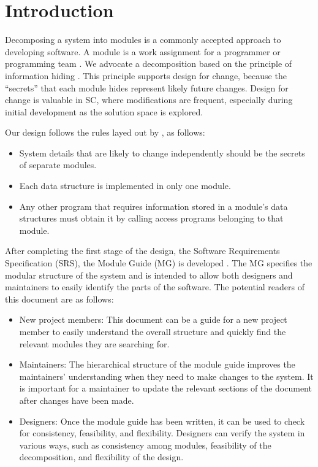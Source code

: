 \documentclass[12pt, titlepage]{article}
\begin{document}
\newpage

\tableofcontents

\listoftables

\listoffigures

\newpage


\section{Introduction}

Decomposing a system into modules is a commonly accepted approach to developing
software.  A module is a work assignment for a programmer or programming
team \cite{ParnasEtAl1984}.  We advocate a decomposition based on the principle of information hiding \cite{Parnas1972a}.  This principle supports design for change, because the ``secrets'' that each module hides represent likely future changes.  Design for change is valuable in SC, where modifications are frequent, especially during initial development as the solution space is explored.  

Our design follows the rules layed out by \cite{ParnasEtAl1984}, as follows:
\begin{itemize}
\item System details that are likely to change independently should be the
  secrets of separate modules.
\item Each data structure is implemented in only one module.
\item Any other program that requires information stored in a module's data
  structures must obtain it by calling access programs belonging to that module.
\end{itemize}

After completing the first stage of the design, the Software Requirements
Specification (SRS), the Module Guide (MG) is developed \cite{ParnasEtAl1984}. The MG specifies the modular structure of the system and is intended to allow both designers and maintainers to easily identify the parts of the software.  The potential readers of this document are as follows:

\begin{itemize}
\item New project members: This document can be a guide for a new project member
  to easily understand the overall structure and quickly find the relevant modules they are searching for.
\item Maintainers: The hierarchical structure of the module guide improves the
  maintainers' understanding when they need to make changes to the system. It is
  important for a maintainer to update the relevant sections of the document
  after changes have been made.
\item Designers: Once the module guide has been written, it can be used to
  check for consistency, feasibility, and flexibility. Designers can verify the
  system in various ways, such as consistency among modules, feasibility of the
  decomposition, and flexibility of the design.
\end{itemize}
\end{document}
